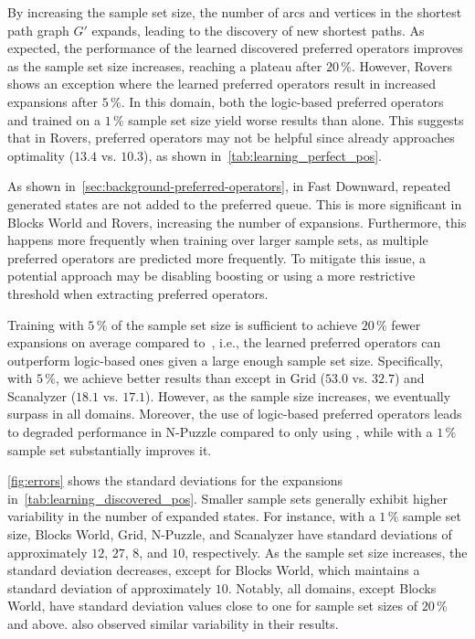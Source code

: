 \documentclass[ppgc,diss,english]{iiufrgs}
\begin{document}


By increasing the sample set size, the number of arcs and vertices in the shortest path graph $G'$ expands, leading to the discovery of new shortest paths. As expected, the performance of the learned discovered preferred operators \pog improves as the sample set size increases, reaching a plateau after $20\,\%$. However, Rovers shows an exception where the learned preferred operators result in increased expansions after $5\,\%$. In this domain, both the logic-based preferred operators \poff and \pog trained on a $1\,\%$ sample set size yield worse results than \hnn alone. This suggests that in Rovers, preferred operators may not be helpful since \hnn already approaches optimality ($13.4$ vs. $10.3$), as shown in~\cref{tab:learning_perfect_pos}.

As shown in~\cref{sec:background-preferred-operators}, in Fast Downward, repeated generated states are not added to the preferred queue. This is more significant in Blocks World and Rovers, increasing the number of expansions. Furthermore, this happens more frequently when training over larger sample sets, as multiple preferred operators are predicted more frequently. To mitigate this issue, a potential approach may be disabling boosting or using a more restrictive threshold when extracting preferred operators.

Training with $5\,\%$ of the sample set size is sufficient to achieve $20\,\%$ fewer expansions on average compared to~\poff, i.e., the learned preferred operators \pog can outperform logic-based ones given a large enough sample set size. Specifically, with $5\,\%$, we achieve better results than \poff except in Grid ($53.0$ vs. $32.7$) and Scanalyzer ($18.1$ vs. $17.1$). However, as the sample size increases, we eventually surpass \poff in all domains. Moreover, the use of logic-based preferred operators \poff leads to degraded performance in N-Puzzle compared to only using \hnn, while \pog with a $1\,\%$ sample set substantially improves it.

\cref{fig:errors} shows the standard deviations for the expansions in~\cref{tab:learning_discovered_pos}. Smaller sample sets generally exhibit higher variability in the number of expanded states. For instance, with a $1\,\%$ sample set size, Blocks World, Grid, N-Puzzle, and Scanalyzer have standard deviations of approximately $12$, $27$, $8$, and $10$, respectively. As the sample set size increases, the standard deviation decreases, except for Blocks World, which maintains a standard deviation of approximately $10$. Notably, all domains, except Blocks World, have standard deviation values close to one for sample set sizes of $20\,\%$ and above. \citet{Bettker.etal/2022} also observed similar variability in their results.
\end{document}
